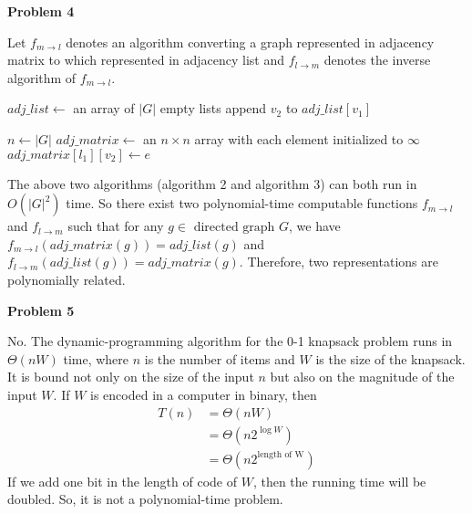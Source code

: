 \documentclass[12pt,letterpaper]{article}
\def\pp{\par\noindent}
\newcommand{\problem}[1]{ \bigskip \pp \textbf{Problem #1}\par}
\begin{document}
\problem{4}
Let $f_{m\to l}$ denotes an algorithm converting a graph represented in adjacency matrix to which represented in adjacency list and $f_{l\to m}$ denotes the inverse algorithm of $f_{m\to l}$.\par
\begin{algorithm}
	\caption{$f_{m\to l}$}
	\begin{algorithmic}[1]
		\STATE $adj\_list \leftarrow$ an array of $|G|$ empty lists
		\STATE append $v_2$ to $adj\_list[v_1]$
		\ENDIF
		\ENDFOR
		\ENDFOR
	\end{algorithmic}
\end{algorithm}\par
\begin{algorithm}
	\caption{$f_{l\to m}$}
	\begin{algorithmic}[1]
		\STATE $n \leftarrow |G|$
		\STATE $adj\_matrix \leftarrow$ an $n\times n$ array with each element initialized to $\infty$
		\STATE $adj\_matrix[l_1][v_2] \leftarrow e$
		\ENDFOR
		\ENDFOR
	\end{algorithmic}
\end{algorithm}\par
The above two algorithms (algorithm 2 and algorithm 3) can both run in $O(|G|^2)$ time. So there exist two polynomial-time computable functions $f_{m\to l}$ and $f_{l\to m}$ such that for any $g\in\text{ directed graph } G$, we have $f_{m\to l}(adj\_matrix(g))=adj\_list(g)$ and $f_{l\to m}(adj\_list(g))=adj\_matrix(g)$. Therefore, two representations are polynomially related.

\problem{5}
No. The dynamic-programming algorithm for the 0-1 knapsack problem runs in $\Theta(nW)$ time, where $n$ is the number of items and $W$ is the size of the knapsack. It is bound not only on the size of the input $n$ but also on the magnitude of the input $W$. If $W$ is encoded in a computer in binary, then
\begin{align*}
	T(n)&=\Theta(nW)\\
	&=\Theta(n2^{\log W})\\
	&=\Theta(n2^{\text{length of W}})
\end{align*}
If we add one bit in the length of code of $W$, then the running time will be doubled. So, it is not a polynomial-time problem.
\end{document}
